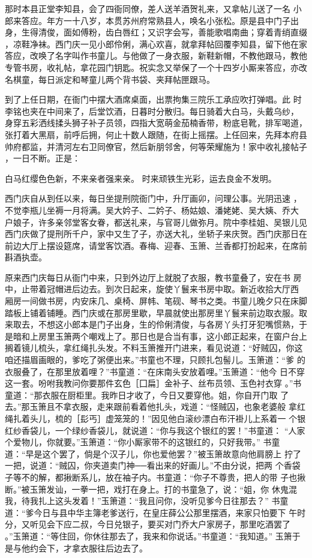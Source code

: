 那时本县正堂李知县，会了四衙同僚，差人送羊酒贺礼来，又拿帖儿送了一名
小郎来答应。年方一十八岁，本贯苏州府常熟县人，唤名小张松。原是县中门子出
身，生得清俊，面如傅粉，齿白唇红；又识字会写，善能歌唱南曲；穿着青绡直缀
，凉鞋净袜。西门庆一见小郎伶俐，满心欢喜，就拿拜帖回覆李知县，留下他在家
答应，改唤了名字叫作书童儿。与他做了一身衣服，新鞋新帽，不教他跟马，教他
专管书房，收礼帖，拿花园门钥匙。祝实念又举保了一个十四岁小厮来答应，亦改
名棋童，每日派定和琴童儿两个背书袋、夹拜帖匣跟马。

到了上任日期，在衙门中摆大酒席桌面，出票拘集三院乐工承应吹打弹唱。此
时李铭也夹在中间来了，后堂饮酒，日暮时分散归。每日骑着大白马，头戴乌纱，
身穿五彩洒线揉头狮子补子员领，四指大宽萌金茄楠香带，粉底皂靴，排军喝道，
张打着大黑扇，前呼后拥，何止十数人跟随，在街上摇摆。上任回来，先拜本府县
帅府都监，并清河左右卫同僚官，然后新朋邻舍，何等荣耀施为！家中收礼接帖子
，一日不断。正是：

白马红缨色色新，不来亲者强来亲。
时来顽铁生光彩，运去良金不发明。

西门庆自从到任以来，每日坐提刑院衙门中，升厅画卯，问理公事。光阴迅速
，不觉李瓶儿坐褥一月将满。吴大妗子、二妗子、杨姑娘、潘姥姥、吴大姨、乔大
户娘子，许多亲邻堂客女眷，都送礼来，与官哥儿做弥月。院中李桂姐、吴银儿见
西门庆做了提刑所千户，家中又生了子，亦送大礼，坐轿子来庆贺。西门庆那日在
前边大厅上摆设筵席，请堂客饮酒。春梅、迎春、玉箫、兰香都打扮起来，在席前
斟酒执壶。

原来西门庆每日从衙门中来，只到外边厅上就脱了衣服，教书童叠了，安在书
房中，止带着冠帽进后边去。到次日起来，旋使丫鬟来书房中取。新近收拾大厅西
厢房一间做书房，内安床几、桌椅、屏帏、笔砚、琴书之类。书童儿晚夕只在床脚
踏板上铺着铺睡。西门庆或在那房里歇，早晨就使出那房里丫鬟来前边取衣服。取
来取去，不想这小郎本是门子出身，生的伶俐清俊，与各房丫头打牙犯嘴惯熟，于
是暗和上房里玉箫两个嘲戏上了。那日也是合当有事，这小郎正起来，在窗户台上
搁着镜儿梳头，拿红绳扎头发。不料玉箫推开门进来，看见说道：“好贼囚，你这
咱还描眉画眼的，爹吃了粥便出来。”书童也不理，只顾扎包髻儿。玉箫道：“爹
的衣服叠了，在那里放着哩？”书童道：“在床南头安放着哩。”玉箫道：“他今
日不穿这一套。吩咐我教问你要那件玄色［囗扁］金补子、丝布员领、玉色衬衣穿
。”书童道：“那衣服在厨柜里。我昨日才收了，今日又要穿他。姐，你自开门取
了去。”那玉箫且不拿衣服，走来跟前看着他扎头，戏道：“怪贼囚，也象老婆般
拿红绳扎着头儿，梳的［髟丐］虚笼笼的！”因见他白滚纱漂白布汗褂儿上系着一
个银红纱香袋儿，一个绿纱香袋儿，就说道：“你与我这个银红的罢！”书童道：
“人家个爱物儿，你就要。”玉箫道：“你小厮家带不的这银红的，只好我带。”
书童道：“早是这个罢了，倘是个汉子儿，你也爱他罢？”被玉箫故意向他肩膀上
拧了一把，说道：“贼囚，你夹道卖门神──看出来的好画儿。”不由分说，把两
个香袋子等不的解，都揪断系儿，放在袖子内。书童道：“你子不尊贵，把人的带
子也揪断。”被玉箫发讪，一拳一把，戏打在身上。打的书童急了，说：“姐，你
休鬼混我，待我扎上这头发着！”玉箫道：“我且问你，没听见爹今日往那去？”
书童道：“爹今日与县中华主簿老爹送行，在皇庄薛公公那里摆酒，来家只怕要下
午时分，又听见会下应二叔，今日兑银子，要买对门乔大户家房子，那里吃酒罢了
。”玉箫道：“等住回，你休往那去了，我来和你说话。”书童道：“我知道。”
玉箫于是与他约会下，才拿衣服往后边去了。

